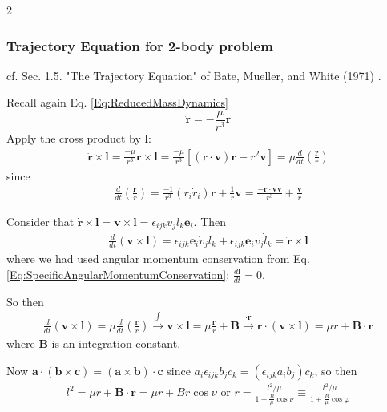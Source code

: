 \documentclass[10pt]{amsart}
\begin{document}
\begin{multicols*}{2}
\subsubsection{Trajectory Equation for 2-body problem}

cf. Sec. 1.5. "The Trajectory Equation" of Bate, Mueller, and White (1971) \cite{BMW1971}.

Recall again Eq. \ref{Eq:ReducedMassDynamics}
\[
\ddot{\mathbf{r}} = - \frac{\mu}{r^3} \mathbf{r}
\]
Apply the cross product by $\mathbf{l}$:
\[
\begin{gathered}
	\ddot{\mathbf{r}} \times \mathbf{l} = \frac{-\mu}{r^3} \mathbf{r} \times \mathbf{l} = \frac{-\mu}{r^3} \left[ (\mathbf{r} \cdot \mathbf{v}) \mathbf{r} - r^2 \mathbf{v} \right] = \mu \frac{d}{dt} \left( \frac{\mathbf{r}}{r} \right)
\end{gathered}
\]
since
\[
\begin{gathered}
	\frac{d}{dt} \left(\frac{\mathbf{r}}{r} \right) = \frac{-1}{r^3} (r_i \dot{r}_i ) \mathbf{r} + \frac{1}{r} \mathbf{v} = \frac{-\mathbf{r}\cdot \mathbf{v} \mathbf{v}}{r^3} + \frac{\mathbf{v}}{r}
\end{gathered}
\]

Consider that $\dot{\mathbf{r}} \times \mathbf{l} = \mathbf{v} \times \mathbf{l} = \epsilon_{ijk} v_j l_k \mathbf{e}_i$. Then
\[
\begin{gathered}
	\frac{d}{dt} (\mathbf{v} \times \mathbf{l}) = \epsilon_{ijk} \mathbf{e}_i \dot{v}_j l_k + \epsilon_{ijk} \mathbf{e}_i v_j \dot{l}_k = \ddot{\mathbf{r}} \times \mathbf{l}
\end{gathered}
\]
where we had used angular momentum conservation from Eq. \ref{Eq:SpecificAngularMomentumConservation}: $\frac{d\mathbf{l}}{dt} = 0$.

So then
\begin{equation}\label{Eq:IntegrateConservedVector}
\begin{gathered}
	\frac{d}{dt} ( \mathbf{v} \times \mathbf{l}) = \mu \frac{d}{dt} \left( \frac{\mathbf{r}}{r} \right) \xrightarrow{ \int } \mathbf{v} \times \mathbf{l} = \mu \frac{\mathbf{r}}{r} + \mathbf{B} \xrightarrow{ \cdot \mathbf{r} } \mathbf{r} \cdot (\mathbf{v} \times \mathbf{l} ) = \mu r + \mathbf{B} \cdot \mathbf{r}
\end{gathered}
\end{equation}
where $\mathbf{B}$ is an integration constant.

Now $\mathbf{a} \cdot (\mathbf{b} \times \mathbf{c}) = (\mathbf{a} \times \mathbf{b}) \cdot \mathbf{c}$ since $a_i \epsilon_{ijk} b_j c_k = (\epsilon_{ijk} a_i b_j) c_k$, so then
\begin{equation}
	\begin{gathered}
		l^2 = \mu r + \mathbf{B}\cdot \mathbf{r} = \mu r + Br \cos{\nu} \text{ or } r = \frac{l^2 / \mu}{ 1 + \frac{B}{\mu} \cos{\nu} } \equiv \frac{l^2/\mu}{ 1 + \frac{B}{\mu} \cos{\varphi} }
	\end{gathered}
\end{equation}


\end{multicols*}
\end{document}
